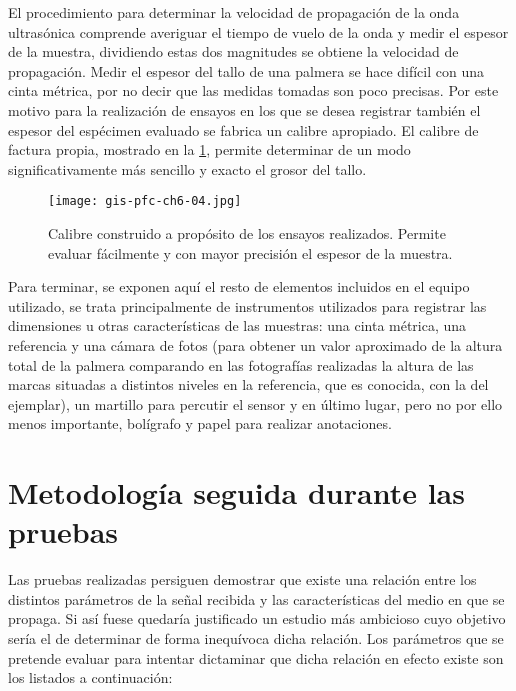 \sshortpage{}

El procedimiento para determinar la velocidad de propagación de la onda
ultrasónica comprende averiguar el tiempo de vuelo de la onda y medir el
espesor de la muestra, dividiendo estas dos magnitudes se obtiene la
velocidad de propagación. Medir el espesor del tallo de una palmera se hace
difícil con una cinta métrica, por no decir que las medidas tomadas son
poco precisas. Por este motivo para la realización de ensayos en los que se
desea registrar también el espesor del espécimen evaluado se fabrica un
calibre apropiado. El calibre de factura propia, mostrado en la
\cref{fig:calibre}, permite determinar de un modo significativamente más
sencillo y exacto el grosor del tallo.

\begin{figure}
    \begin{center}
	\texttt{[image: gis-pfc-ch6-04.jpg]}
    \end{center}
    \caption[Calibre en los ensayos]{Calibre construido a propósito de los
    ensayos realizados. Permite evaluar fácilmente y con mayor precisión el
    espesor de la muestra.}
    \label{fig:calibre}
\end{figure}

Para terminar, se exponen aquí el resto de elementos incluidos en el equipo
utilizado, se trata principalmente de instrumentos utilizados para
registrar las dimensiones u otras características de las muestras: una
cinta métrica, una referencia y una cámara de fotos (para obtener un valor
aproximado de la altura total de la palmera comparando en las fotografías
realizadas la altura de las marcas situadas a distintos niveles en la
referencia, que es conocida, con la del ejemplar), un martillo para
percutir el sensor y en último lugar, pero no por ello menos importante,
bolígrafo y papel para realizar anotaciones.


\section{Metodología seguida durante las pruebas}\label{sec:methodology}

Las pruebas realizadas persiguen demostrar que existe una relación entre
los distintos parámetros de la señal recibida y las características del
medio en que se propaga. Si así fuese quedaría justificado un estudio más
ambicioso cuyo objetivo sería el de determinar de forma inequívoca dicha
relación. Los parámetros que se pretende evaluar para intentar dictaminar
que dicha relación en efecto existe son los listados a continuación:

